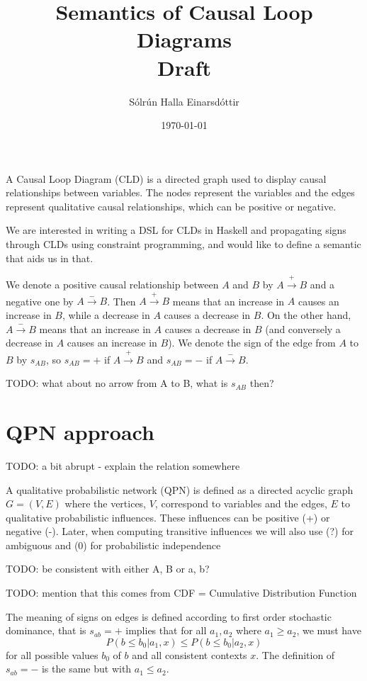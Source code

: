 \documentclass[a4paper,11pt]{article}
\title{Semantics of Causal Loop Diagrams\\ Draft}
\author{Sólrún Halla Einarsdóttir}
\date{\today}
\begin{document}
\maketitle
A Causal Loop Diagram (CLD) is a directed graph used to display causal
relationships between variables.
%
The nodes represent the variables and the edges represent qualitative
causal relationships, which can be positive or negative.

We are interested in writing a DSL for CLDs in Haskell and propagating
signs through CLDs using constraint programming, and would like to
define a semantic that aids us in that.

We denote a positive causal relationship between $A$ and $B$ by
$A\xrightarrow{+} B$ and a negative one by $A \xrightarrow{-} B$.
%
Then $A \xrightarrow{+} B$ means that an increase in $A$ causes an
increase in $B$, while a decrease in $A$ causes a decrease in $B$.
%
On the other hand, $A\xrightarrow{-} B$ means that an increase in $A$
causes a decrease in $B$ (and conversely a decrease in $A$ causes an
increase in $B$).
%
We denote the sign of the edge from $A$ to $B$ by $s_{AB}$, so
$s_{AB}= +$ if $A\xrightarrow{+} B$ and $s_{AB}=-$ if
$A\xrightarrow{-} B$.

TODO: what about no arrow from A to B, what is $s_{AB}$ then?

\section{QPN approach}

TODO: a bit abrupt - explain the relation somewhere

A qualitative probabilistic network (QPN) is defined as a directed
acyclic graph $G=(V,E)$ where the vertices, $V$, correspond to
variables and the edges, $E$ to qualitative probabilistic influences.
%
These influences can be positive (+) or negative (-).
%
Later, when computing transitive influences we will also use (?) for
ambiguous and (0) for probabilistic independence

TODO: be consistent with either A, B or a, b?

TODO: mention that this comes from CDF = Cumulative Distribution Function

The meaning of signs on edges is defined according to first order
stochastic dominance, that is $s_{ab}=+$ implies that for all
$a_1,a_2$ where $a_1\geq a_2$, we must have
\[P(b \leq b_0| a_1,x)\leq P(b\leq b_0| a_2,x)\]
for all possible values $b_0$ of $b$ and all consistent contexts $x$.
%
The definition of $s_{ab}=-$ is the same but with $a_1\leq a_2$.
\end{document}
